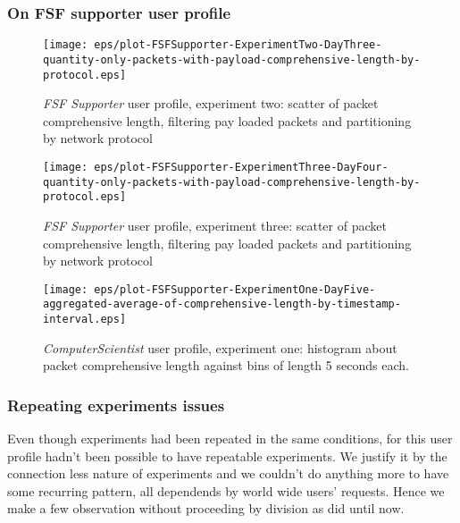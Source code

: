 \documentclass[10pt,a4paper]{article}
\begin{document}
    \newpage

    \subsubsection{On FSF supporter user profile}

    \begin{figure}
      \centering
      \texttt{[image: eps/plot-FSFSupporter-ExperimentTwo-DayThree-quantity-only-packets-with-payload-comprehensive-length-by-protocol.eps]}
      \caption{\emph{FSF Supporter} user profile, experiment two:
        scatter of packet comprehensive length, filtering pay loaded
        packets and partitioning by network protocol}
      \label{fig:fsf-supporter-ubuntu-scatter}
    \end{figure}

    \begin{figure}
      \centering
      \texttt{[image: eps/plot-FSFSupporter-ExperimentThree-DayFour-quantity-only-packets-with-payload-comprehensive-length-by-protocol.eps]}
      \caption{\emph{FSF Supporter} user profile, experiment three:
        scatter of packet comprehensive length, filtering pay loaded
        packets and partitioning by network protocol}
      \label{fig:fsf-supporter-xubuntu-scatter}
    \end{figure}

    \begin{figure}
      \centering
      \texttt{[image: eps/plot-FSFSupporter-ExperimentOne-DayFive-aggregated-average-of-comprehensive-length-by-timestamp-interval.eps]}
      \caption{\emph{ComputerScientist} user profile, experiment one:
        histogram about packet comprehensive length against bins of
        length 5 seconds each.}
      \label{fig:fsf-supporter-kubuntu-histogram}
    \end{figure}

    \subsubsection*{Repeating experiments issues}
    
    Even though experiments had been repeated in the same conditions,
    for this user profile hadn't been possible to have repeatable
    experiments. We justify it by the connection less nature of
    experiments and we couldn't do anything more to have some
    recurring pattern, all dependends by world wide users'
    requests. Hence we make a few observation without proceeding by
    division as did until now.
\end{document}
